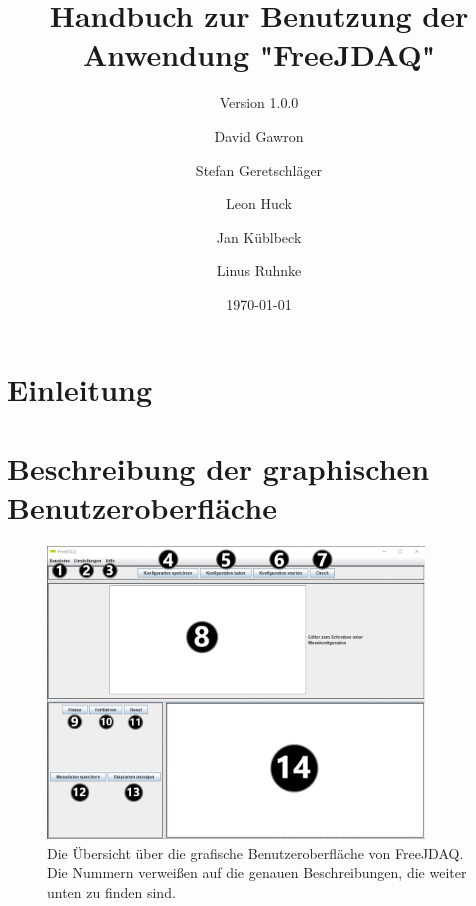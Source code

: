 \documentclass[parskip=full]{scrartcl}
\title{Handbuch zur Benutzung der Anwendung "FreeJDAQ"}
\subtitle{Version 1.0.0}
\author{David Gawron \and Stefan Geretschläger \and Leon Huck \and Jan Küblbeck \and Linus Ruhnke}
\date{\today}
\begin{document}
\maketitle

\clearpage
\tableofcontents 					%

\section{Einleitung}
\section{Beschreibung der graphischen Benutzeroberfläche}

\begin{figure}[htbp]
    \begin{center}
        \includegraphics[width = 10cm]{Grafiken/Uebersicht_GUI_Mit_Nummern.png}
        \caption{Die Übersicht über die grafische Benutzeroberfläche von FreeJDAQ. Die Nummern verweißen auf die genauen Beschreibungen, die weiter unten zu finden sind.}
        \label{Uebersicht_GUI_Mit_Nummern}
    \end{center}
\end{figure}
\end{document}
